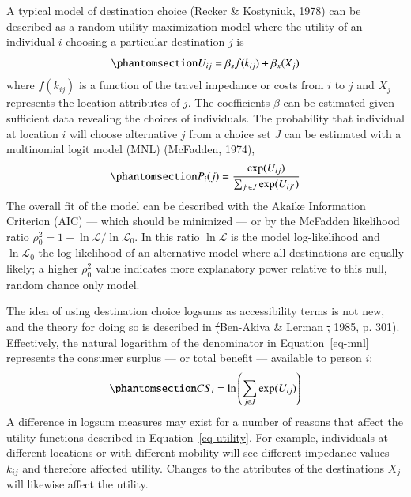 \documentclass[
  letterpaper,
  number,
  review,
  3p]{elsarticle}
\makeatletter
\providecommand{\DIFadd}[1]{{\protect\color{blue}\uwave{#1}}} %
\providecommand{\DIFdel}[1]{{\protect\color{red}\sout{#1}}} %
\providecommand{\DIFaddbegin}{} %
\providecommand{\DIFaddend}{} %
\providecommand{\DIFdelbegin}{} %
\providecommand{\DIFdelend}{} %
\newcommand{\DIFscaledelfig}{0.5}
\newlength{\DIFdelgraphicswidth} %
\newlength{\DIFdelgraphicsheight} %
\newcommand{\DIFaddincludegraphics}[2][]{{\color{blue}\fbox{\DIFOincludegraphics[#1]{#2}}}} %
\newcommand{\DIFdelincludegraphics}[2][]{%
\sbox{\DIFdelgraphicsbox}{\DIFOincludegraphics[#1]{#2}}%
\settoboxwidth{\DIFdelgraphicswidth}{\DIFdelgraphicsbox} %
\settoboxtotalheight{\DIFdelgraphicsheight}{\DIFdelgraphicsbox} %
\scalebox{\DIFscaledelfig}{%
\parbox[b]{\DIFdelgraphicswidth}{\usebox{\DIFdelgraphicsbox}\\[-\baselineskip] \rule{\DIFdelgraphicswidth}{0em}}\llap{\resizebox{\DIFdelgraphicswidth}{\DIFdelgraphicsheight}{%
\setlength{\unitlength}{\DIFdelgraphicswidth}%
\begin{picture}(1,1)%
\thicklines\linethickness{2pt} %
{\color[rgb]{1,0,0}\put(0,0){\framebox(1,1){}}}%
{\color[rgb]{1,0,0}\put(0,0){\line( 1,1){1}}}%
{\color[rgb]{1,0,0}\put(0,1){\line(1,-1){1}}}%
\end{picture}%
}\hspace*{3pt}}} %
} %
\DeclareRobustCommand{\DIFaddbegin}{\DIFOaddbegin \let\includegraphics\DIFaddincludegraphics} %
\DeclareRobustCommand{\DIFaddend}{\DIFOaddend \let\includegraphics\DIFOincludegraphics} %
\DeclareRobustCommand{\DIFdelbegin}{\DIFOdelbegin \let\includegraphics\DIFdelincludegraphics} %
\DeclareRobustCommand{\DIFdelend}{\DIFOaddend \let\includegraphics\DIFOincludegraphics} %
\let\sout@orig\sout %
\renewcommand{\sout}[1]{\ifmmode\text{\sout@orig{\ensuremath{#1}}}\else\sout@orig{#1}\fi} %
\makeatother
\begin{document}
A typical model of destination choice (Recker \& Kostyniuk, 1978) can be
described as a random utility maximization model where the utility of an
individual \(i\) choosing a particular destination \(j\) is
\begin{equation}\phantomsection\label{eq-utility}{
 U_{ij} = \beta_{s}f(k_{ij}) + \beta_{x}(X_j) 
}\end{equation} where \(f(k_{ij})\) is a function of the travel
impedance or costs from \(i\) to \(j\) and \(X_{j}\) represents the
location attributes of \(j\). The coefficients \(\beta\) can be
estimated given sufficient data revealing the choices of individuals.
The probability that individual at location \(i\) will choose
alternative \(j\) from a choice set \(J\) can be estimated with a
multinomial logit model (MNL) (McFadden, 1974),
\begin{equation}\phantomsection\label{eq-mnl}{ 
P_i(j) = \frac{\exp(U_{ij})}{\sum_{j' \in J}{\exp(U_{ij'})}}
}\end{equation} The overall fit of the model can be described with the
Akaike Information Criterion (AIC) --- which should be minimized --- or
by the McFadden likelihood ratio
\(\rho^2_0 = 1 - \ln\mathcal{L} / \ln\mathcal{L}_0\). In this ratio
\(\ln{\mathcal{L}}\) is the model log-likelihood and
\(\ln{\mathcal{L}_0}\) the log-likelihood of an alternative model where
all destinations are equally likely; a higher \(\rho^2_0\) value
indicates more explanatory power relative to this null, random chance
only model.

The idea of using destination choice logsums as accessibility terms is
not new, and the theory for doing so is described in \DIFdelbegin \DIFdel{(}\DIFdelend Ben-Akiva \& Lerman
\DIFdelbegin \DIFdel{, }\DIFdelend \DIFaddbegin \DIFadd{(}\DIFaddend 1985, p. 301). Effectively, the natural logarithm of the denominator in
Equation~\ref{eq-mnl} represents the consumer surplus --- or total
benefit --- available to person \(i\):
\begin{equation}\phantomsection\label{eq-cs}{ 
CS_i = \ln\left(\sum_{j \in J} \exp(U_{ij})\right)
}\end{equation} A difference in logsum measures may exist for a number
of reasons that affect the utility functions described in
Equation~\ref{eq-utility}. For example, individuals at different
locations or with different mobility will see different impedance values
\(k_{ij}\) and therefore affected utility. Changes to the attributes of
the destinations \(X_j\) will likewise affect the utility.
\end{document}
